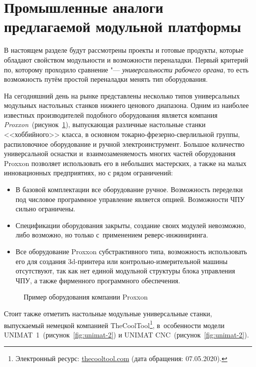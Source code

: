 \section{Промышленные аналоги предлагаемой модульной платформы}\label{sec:ch1/industrial-examples}


В настоящем разделе будут рассмотрены проекты и готовые продукты, которые обладают свойством модульности и возможности переналадки. Первый критерий по, которому проходило сравнение "--- \textit{универсальности рабочего органа}, то есть возможность путём простой переналадки менять тип оборудования. 

На сегодняшний день на рынке представлены несколько типов универсальных модульных настольных станков нижнего ценового диапазона. Одним из наиболее известных производителей подобного оборудования является компания \textit{Proxxon}~(рисунок~\cref{fig:proxxon}), выпускающая различные настольные станки <<хоббийного>> класса, в основном токарно-фрезерно-сверлильной группы, распиловочное оборудование и ручной электроинструмент. Большое количество универсальной оснастки и~взаимозаменяемость многих частей оборудования Proxxon позволяет использовать его в небольших мастерских, а также на малых инновационных предприятиях, но с рядом ограничений:

\begin{itemize}
	\item В базовой комплектации все оборудование ручное. Возможность переделки под числовое программное управление является опцией. Возможности ЧПУ сильно ограничены.
	\item Спецификации оборудования закрыты, создание своих модулей невозможно, либо возможно, но только с~применением реверс-инжиниринга.
	\item Все оборудование Proxxon субстрактивного типа, возможность использовать его для создания 3d-принтера или контрольно-измерительной машины отсутствуют, так как нет единой модульной структуры блока управления ЧПУ, а также фирменного программного обеспечения.	
\end{itemize}

\begin{figure}[ht]
	\caption{Пример оборудования компании Proxxon}\label{fig:proxxon}
\end{figure}

Стоит также отметить настольные модульные универсальные станки, выпускаемый немецкой компанией TheCoolTool\footnote{Электронный ресурс: {\small\url{thecooltool.com}} (дата обращения: 07.05.2020).}, в~особенности модели UNIMAT~1~(рисунок~\cref{fig:unimat-2}) и UNIMAT CNC~(рисунок~\cref{fig:unimat-2}).

